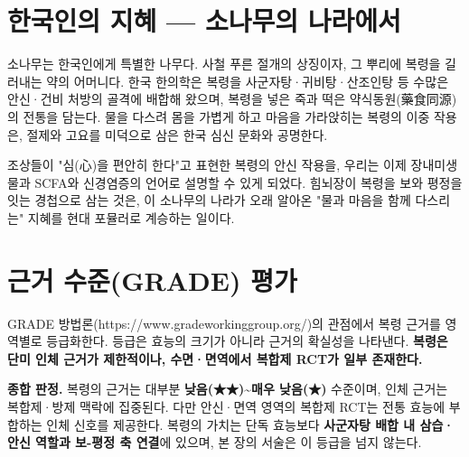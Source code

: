 \documentclass[11pt,oneside]{book}
\begin{document}
\section{한국인의 지혜 — 소나무의 나라에서}
소나무는 한국인에게 특별한 나무다. 사철 푸른 절개의 상징이자, 그 뿌리에 복령을 길러내는 약의 어머니다. 한국 한의학은 복령을 사군자탕·귀비탕·산조인탕 등 수많은 안신·건비 처방의 골격에 배합해 왔으며, 복령을 넣은 죽과 떡은 약식동원(藥食同源)의 전통을 담는다. 물을 다스려 몸을 가볍게 하고 마음을 가라앉히는 복령의 이중 작용은, 절제와 고요를 미덕으로 삼은 한국 심신 문화와 공명한다.

조상들이 "심(心)을 편안히 한다"고 표현한 복령의 안신 작용을, 우리는 이제 장내미생물과 SCFA와 신경염증의 언어로 설명할 수 있게 되었다. 힘뇌장이 복령을 보와 평정을 잇는 경첩으로 삼는 것은, 이 소나무의 나라가 오래 알아온 "물과 마음을 함께 다스리는" 지혜를 현대 포뮬러로 계승하는 일이다.

\section{근거 수준(GRADE) 평가}
GRADE 방법론(https://www.gradeworkinggroup.org/)의 관점에서 복령 근거를 영역별로 등급화한다. 등급은 효능의 크기가 아니라 근거의 확실성을 나타낸다. \textbf{복령은 단미 인체 근거가 제한적이나, 수면·면역에서 복합제 RCT가 일부 존재한다.}

\vspace{2pt}\vspace{3pt}

\textbf{종합 판정.} 복령의 근거는 대부분 \textbf{낮음(★★)\textasciitilde{}매우 낮음(★)} 수준이며, 인체 근거는 복합제·방제 맥락에 집중된다. 다만 안신·면역 영역의 복합제 RCT는 전통 효능에 부합하는 인체 신호를 제공한다. 복령의 가치는 단독 효능보다 \textbf{사군자탕 배합 내 삼습·안신 역할과 보-평정 축 연결}에 있으며, 본 장의 서술은 이 등급을 넘지 않는다.
\end{document}
